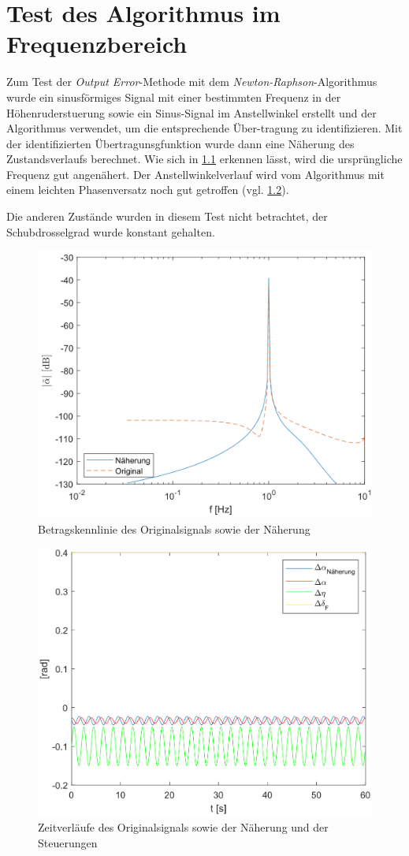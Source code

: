 \chapter{Test des Algorithmus im Frequenzbereich}\label{appendix:test_algorithmus}

Zum Test der \textit{Output Error}-Methode mit dem \textit{Newton-Raphson}-Algorithmus wurde ein sinusförmiges Signal 
mit einer bestimmten Frequenz in der Höhenruderstuerung sowie ein Sinus-Signal im Anstellwinkel erstellt und der Algorithmus 
verwendet, um die entsprechende Über-tragung zu identifizieren. Mit der 
identifizierten Übertragunsgfunktion wurde dann eine Näherung des 
Zustandsverlaufs berechnet. Wie sich in 
\cref{fig:testdaten1} erkennen lässt, wird die 
ursprüngliche Frequenz gut angenähert. Der Anstellwinkelverlauf wird vom Algorithmus mit einem leichten Phasenversatz noch 
gut getroffen (vgl. \cref{fig:testdaten2}).\par
Die anderen Zustände wurden in diesem Test nicht betrachtet, der Schubdrosselgrad wurde konstant gehalten.

\begin{figure}[!h]
	\centering
	\includegraphics[width=0.6\linewidth]{src/pics/Testdaten1}
	\caption{Betragskennlinie des Originalsignals sowie der Näherung}
	\label{fig:testdaten1}
\end{figure}

\begin{figure}[!h]
	\centering
	\includegraphics[width=0.6\linewidth]{src/pics/Testdaten2}
	\caption{Zeitverläufe des Originalsignals sowie der Näherung und der 
	Steuerungen}
	\label{fig:testdaten2}
\end{figure}
